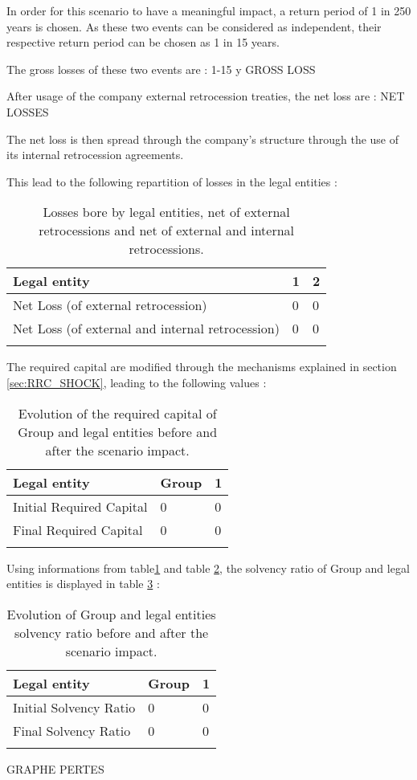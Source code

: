 In order for this scenario to have a meaningful impact, a return period of 1 in 250 years is chosen. As these two events can be considered as independent, their respective return period can be chosen as 1 in 15 years.

The gross losses of these two events are : 1-15 y GROSS LOSS


After usage of the company external retrocession treaties, the net loss are : NET LOSSES

The net loss is then spread through the company's structure through the use of its internal retrocession agreements.

This lead to the following repartition of losses in the legal entities :

\begin{table}
\centering
\begin{tabular}{|l|l|l|}
\hline
   \textbf{Legal entity} & \textbf{1} & \textbf{2} \\ \hline \hline
   Net Loss (of external retrocession) & 0 & 0 \\ \hline
   Net Loss (of external and internal retrocession) & 0 & 0 \\ \hline
   \label{t:CAT_NAT_LOSS}
\end{tabular}
   \caption{Losses bore by legal entities, net of external retrocessions and net of external and internal retrocessions.}
\end{table}


The required capital are modified through the mechanisms explained in section \ref{sec:RRC_SHOCK}, leading to the following values :

\begin{table}
\centering
\begin{tabular}{|l|l|l|}
\hline
   \textbf{Legal entity} & \textbf{Group} & \textbf{1} \\ \hline \hline
   Initial Required Capital & 0 & 0 \\ \hline
   Final Required Capital & 0 & 0 \\ \hline
   \label{t:CAT_NAT_RRC}
\end{tabular}
   \caption{Evolution of the required capital of Group and legal entities before and after the scenario impact.}
\end{table}


Using informations from table\ref{t:CAT_NAT_LOSS} and table \ref{t:CAT_NAT_RRC}, the solvency ratio of Group and legal entities is displayed in table \ref{t:CAT_NAT_SR} :

\begin{table}
\centering
\begin{tabular}{|l|l|l|}
\hline
   \textbf{Legal entity} & \textbf{Group} & \textbf{1} \\ \hline \hline
   Initial Solvency Ratio & 0 & 0 \\ \hline
   Final Solvency Ratio & 0 & 0 \\ \hline
   \label{t:CAT_NAT_SR}
\end{tabular}
   \caption{Evolution of Group and legal entities solvency ratio before and after the scenario impact.}
\end{table}


GRAPHE PERTES